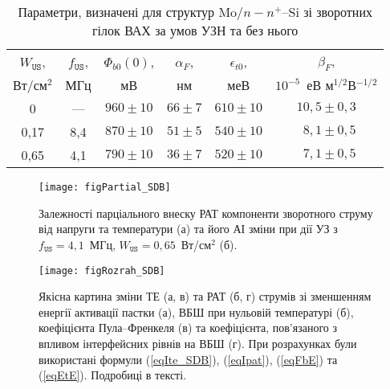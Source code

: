 \documentclass[a4paper,14pt,oneside,openany]{memoir}
\begin{document}
\begin{table}
\caption{Параметри, визначені для структур Mo$/n-n^+$--Si зі зворотних гілок ВАХ за умов УЗН та без нього}
\label{tabSDBParZv}
\centering
\begin{tabular}{|c|c|c|c|c|c|}
\hline
$W_\mathtt{US}$, &$f_\mathtt{US}$,&$\Phi_{b0}(0)$,&$\alpha_F$,&$\epsilon_{t0}$,&$\beta_F$,\\
Вт/см$^2$&МГц&мВ&нм&меВ&$10^{-5}$~еВ м$^{1/2}$В$^{-1/2}$\\\hline
0&---&$960\pm10$&$66\pm7$&$610\pm10$&$10,5\pm0,3$\\\hline
0,17&8,4&$870\pm10$&$51\pm5$&$540\pm10$&$\;\:8,1\pm0,5$\\\hline
0,65&4,1&$790\pm10$&$36\pm7$&$520\pm10$&$\;\:7,1\pm0,5$\\\hline
\end{tabular}
\end{table}




\begin{figure}
\center
\texttt{[image: figPartial\_SDB]}
\caption{\label{figPartial_SDB}
Залежності парціального внеску РАТ компоненти зворотного струму від напруги та температури (а)
та його АІ зміни при дії УЗ з $f_\mathtt{US}=4,1$~МГц, $W_\mathtt{US}=0,65$~Вт/см$^2$ (б).
}%
\end{figure}

\begin{figure}
\center
\texttt{[image: figRozrah\_SDB]}
\caption{\label{figRozrah_SDB}
Якісна картина зміни ТЕ (а, в) та РАТ (б, г) струмів зі зменшенням енергії активації пастки (а),
ВБШ при нульовій температурі (б),
коефіцієнта Пула--Френкеля (в)
та коефіцієнта, пов'язаного з впливом інтерфейсних рівнів на ВБШ (г).
При розрахунках були використані формули (\ref{eqIte_SDB}), (\ref{eqIpat}), (\ref{eqFbE}) та (\ref{eqEtE}).
Подробиці в тексті.
}%
\end{figure}
\end{document}
